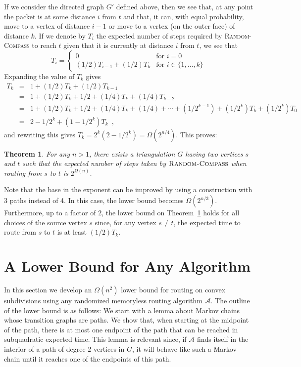 \documentclass [letterpaper] {patmorin}
\newtheorem{theorem}{Theorem}%
\begin{document}
If we consider the directed graph $G'$ defined above, then we see that, at any point the packet is at some distance $i$ from $t$ and that, it can, with equal probability, move to a vertex  of distance $i-1$ or move to a vertex (on the outer face) of distance $k$.  If we denote by $T_i$ the expected number of steps required by \textsc{Random-Compass} to reach $t$ given that it is currently at distance $i$ from $t$, we see that 
\[ 
  T_i = \left\{ \begin{array}{ll}
          0 & \mbox{for $i=0$} \\
          (1/2)T_{i-1} + (1/2)T_k & \mbox{for $i\in\{1,\ldots,k\}$} 
        \end{array}\right.
\]
Expanding the value of $T_k$ gives
\begin{eqnarray*}
  T_k & = & 1 + (1/2)T_k + (1/2)T_{k-1} \\
      & = & 1 + (1/2)T_k + 1/2 + (1/4)T_{k} + (1/4)T_{k-2} \\
      & = & 1 + (1/2)T_k + 1/2 + (1/4)T_{k} + (1/4)
              + \cdots  + (1/2^{k-1}) + (1/2^{k})T_{k} + (1/2^{k})T_0 \\
      & = & 2-1/2^{k} + (1-1/2^k)T_k \enspace ,
\end{eqnarray*}
and rewriting this gives $T_k = 2^k(2-1/2^{k}) = \Omega(2^{n/4})$.  This proves:

\begin{theorem}\label{theorem:random-compass}
For any $n>1$, there exists a triangulation $G$ having two vertices $s$ and $t$ such that the expected number of steps taken by $\textsc{Random-Compass}$ when routing from $s$ to $t$ is $2^{\Omega(n)}$.
\end{theorem}

Note that the base in the exponent can be improved by using a construction with 3 paths instead of 4.  In this case, the lower bound becomes $\Omega(2^{n/3})$.  Furthermore, up to a factor of 2, the lower bound on Theorem~\ref{theorem:random-compass} holds for all choices of the source vertex $s$ since, for any vertex $s\neq t$, the expected time to route from $s$ to $t$ is at least $(1/2)T_k$.

\section{A Lower Bound for Any Algorithm}

In this section we develop an $\Omega(n^2)$ lower bound for routing on convex subdivisions using any randomized memoryless routing algorithm $\mathcal{A}$.  The outline of the lower bound is as follows:  We start with a lemma about Markov chains whose transition graphs are paths. We show that, when starting at the midpoint of the path, there is at most one endpoint of the path that can be reached in subquadratic expected time.  This lemma is relevant since, if $\mathcal{A}$ finds itself in the interior of a path of degree 2 vertices in $G$, it will behave like such a Markov chain until it reaches one of the endpoints of this path.
\end{document}
